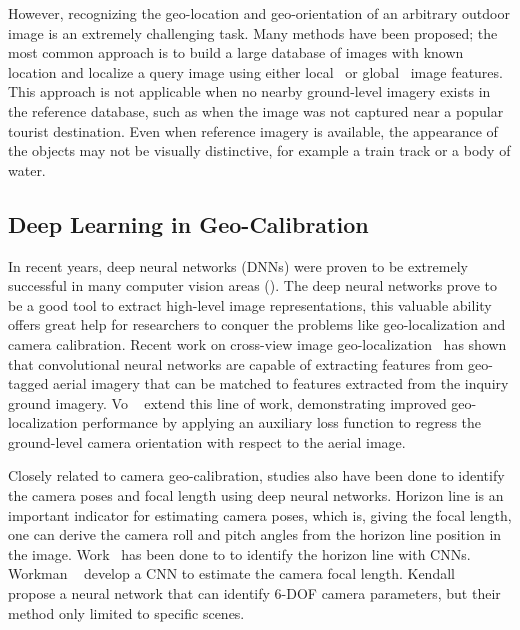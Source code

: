However, recognizing the geo-location and geo-orientation of an
arbitrary outdoor image is an extremely challenging task.  Many
methods have been proposed; the most common approach is to build a
large database of images with known location and localize a query
image using either local~\cite{li2010location,schindler2008detecting}
or global~\cite{hays2008im2gps,doersch2012what} image features.  This
approach is not applicable when no nearby ground-level imagery exists
in the reference database, such as when the image was not captured
near a popular tourist destination.  Even when reference imagery is
available, the appearance of the objects may not be visually
distinctive, for example a train track or a body of water. 


\subsection{Deep Learning in Geo-Calibration}
In recent years, deep neural networks (DNNs) were proven to be
extremely successful in many computer vision areas (). 
The deep neural networks prove to be a good tool to extract high-level
image representations, this valuable ability offers great help for researchers
to conquer the problems like geo-localization and camera calibration.
Recent work on cross-view image
geo-localization~\cite{lin2013cross,lin2015learning,workman2015geocnn,workman2015wide}
has shown that convolutional neural networks are capable of extracting
features from geo-tagged aerial imagery that can be matched to features extracted
from the inquiry ground imagery.  Vo \etal~\cite{vo2016localizing} extend this
line of work, demonstrating improved geo-localization performance by
applying an auxiliary loss function to regress the ground-level camera
orientation with respect to the aerial image. 

Closely related to camera geo-calibration, studies also have been done
to identify the camera poses and focal length using deep neural
networks.
Horizon line is an important indicator for estimating camera poses,
which is, giving the focal length, one can derive the camera roll and
pitch angles from the horizon line position in the image.
Work~\cite{zhai2016horizon, workman2016horizon, hold2017perceptual}
has been done to to identify the horizon line with CNNs.  Workman
\etal~\cite{workman2015deepfocal} develop a CNN to estimate the camera
focal length. Kendall \etal~\cite{kendall2015convolutional} propose a
neural network that can identify 6-DOF camera parameters, but their
method only limited to specific scenes.


